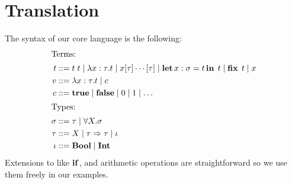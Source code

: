 \documentclass[paper.tex]{subfiles}
\begin{document}
\section{Translation}
\label{sec:formalization}


The syntax of our core language is the following:
\newcommand{\alt}{\mid}
\begin{align*}
\shortintertext{Terms:}
t       &::= t\;t \alt \func{x: \tau}{t} \alt x[\tau]\dotsm[\tau] \alt \llet{x:
  \sigma}{t}{t} \alt \kfix\;t \alt x \\
v       &::= \func{x: \tau}{t} \alt c\\
c       &::= \ktrue \alt \kfalse \alt 0 \alt 1 \alt \dots\\
\shortintertext{Types:}
\sigma  &::= \tau \alt \univ{X}{\sigma}\\
\tau    &::= X \alt \Func{\tau}{\tau} \alt \btyp\\
\btyp   &::= \kbool \alt \kint
\end{align*}
Extensions to \calculus like $\operatorname{\mathbf{if}}$, and arithmetic operations are straightforward so we use them freely in our examples.


\end{document}

